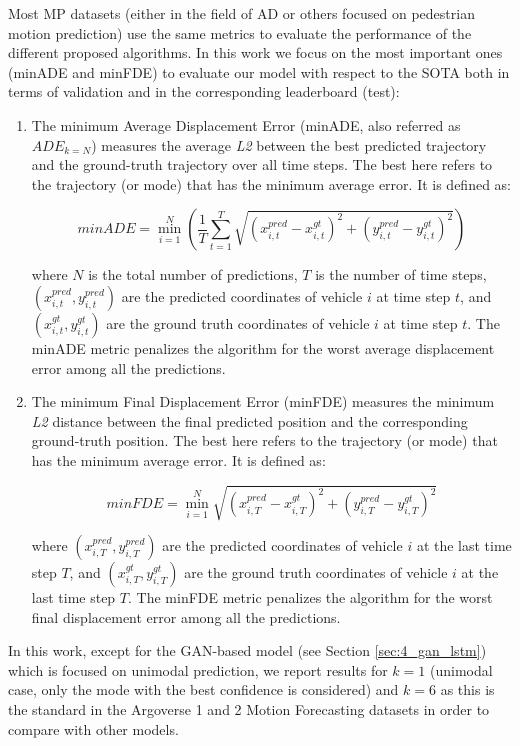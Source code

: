 Most \ac{MP} datasets (either in the field of \ac{AD} or others focused on pedestrian motion prediction) use the same metrics to evaluate the performance of the different proposed algorithms. In this work we focus on the most important ones (\ac{minADE} and \ac{minFDE}) to evaluate our model with respect to the \ac{SOTA} both in terms of validation and in the corresponding leaderboard (test):

\begin{enumerate}
	
	\item The minimum Average Displacement Error (minADE, also referred as $ADE_{k=N}$) measures the average \textit{L2} between the best predicted trajectory and the ground-truth trajectory over all time steps. The best here refers to the trajectory (or mode) that has the minimum average error. It is defined as:
	
	\[
	minADE = \min_{i=1}^{N} \left( \frac{1}{T}\sum_{t=1}^{T}\sqrt{{(x_{i,t}^{pred} - x_{i,t}^{gt})}^2 + {(y_{i,t}^{pred} - y_{i,t}^{gt})}^2} \right)
	\]
	
	where $N$ is the total number of predictions, $T$ is the number of time steps, $(x_{i,t}^{pred}, y_{i,t}^{pred})$ are the predicted coordinates of vehicle $i$ at time step $t$, and $(x_{i,t}^{gt}, y_{i,t}^{gt})$ are the ground truth coordinates of vehicle $i$ at time step $t$. The minADE metric penalizes the algorithm for the worst average displacement error among all the predictions.
	
	\item The minimum Final Displacement Error (minFDE) measures the minimum \textit{L2} distance between the final predicted position and the corresponding ground-truth position. The best here refers to the trajectory (or mode) that has the minimum average error. It is defined as:
	
	\[
	minFDE = \min_{i=1}^{N} \sqrt{{(x_{i,T}^{pred} - x_{i,T}^{gt})}^2 + {(y_{i,T}^{pred} - y_{i,T}^{gt})}^2}
	\]
	
	where $(x_{i,T}^{pred}, y_{i,T}^{pred})$ are the predicted coordinates of vehicle $i$ at the last time step $T$, and $(x_{i,T}^{gt}, y_{i,T}^{gt})$ are the ground truth coordinates of vehicle $i$ at the last time step $T$. The minFDE metric penalizes the algorithm for the worst final displacement error among all the predictions.
	
\end{enumerate}

In this work, except for the GAN-based model (see Section \ref{sec:4_gan_lstm}) which is focused on unimodal prediction, we report results for $k=1$ (unimodal case, only the mode with the best confidence is considered) and $k=6$ as this is the standard in the Argoverse 1 and 2 Motion Forecasting datasets in order to compare with other models.

